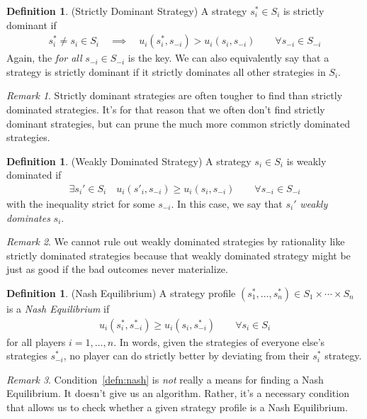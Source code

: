\documentclass[12pt]{article}
\theoremstyle{plain}
\theoremstyle{definition}
\newtheorem{defn}[thm]{Definition}
\theoremstyle{remark}
\newtheorem*{rmk}{Remark}
\begin{document}
\begin{defn}(Strictly Dominant Strategy)
A strategy $s^*_i\in S_i$ is strictly dominant if
\begin{align*}
  s^*_i\neq s_i \in S_i
  \quad\implies\quad
  u_i(s^*_i,s_{-i})
  >
  u_i(s_i,s_{-i})
  \qquad \forall s_{-i}\in S_{-i}
\end{align*}
Again, the \emph{for all} $s_{-i}\in S_{-i}$ is the key.
We can also equivalently say that a strategy is strictly dominant if it
strictly dominates all other strategies in $S_i$.
\end{defn}
\begin{rmk}
Strictly dominant strategies are often tougher to find than strictly
dominated strategies. It's for that reason that we often don't find
strictly dominant strategies, but can prune the much more common
strictly dominated strategies.
\end{rmk}

\begin{defn}(Weakly Dominated Strategy)
A strategy $s_i\in S_i$ is weakly dominated if
\begin{align*}
  \exists s_i' \in S_i
  \quad
  u_i(s'_i,s_{-i})
  \geq
  u_i(s_i,s_{-i})
  \qquad \forall s_{-i}\in S_{-i}
\end{align*}
with the inequality strict for some $s_{-i}$.
In this case, we say that $s_i'$ \emph{weakly dominates} $s_i$.
\end{defn}
\begin{rmk}
We cannot rule out weakly dominated strategies by rationality like
strictly dominated strategies because that weakly dominated strategy
might be just as good if the bad outcomes never materialize.
\end{rmk}


\begin{defn}(Nash Equilibrium)
A strategy profile
$(s^*_1,\ldots,s^*_n) \in S_1 \times \cdots \times S_n$
is a \emph{Nash Equilibrium} if
\begin{align}
  u_i(s^*_i,s^*_{-i})
  \geq
  u_i(s_i,s^*_{-i})
  \qquad
  \forall s_i \in S_i
  \label{defn:nash}
\end{align}
for all players $i=1,\ldots,n$. In words, given the strategies of
everyone else's strategies $s^*_{-i}$,  no player can do strictly better
by deviating from their $s^*_i$ strategy.
\end{defn}
\begin{rmk}
Condition~\ref{defn:nash} is \emph{not} really a means for finding a Nash
Equilibrium. It doesn't give us an algorithm.
Rather, it's a necessary condition that allows us to check whether a
given strategy profile is a Nash Equilibrium.
\end{rmk}
\end{document}
